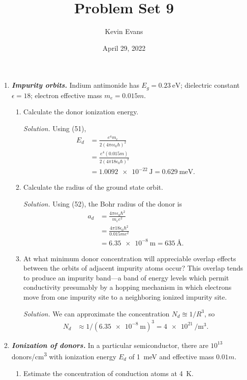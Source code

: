 \documentclass{homework}
\title{Problem Set 9}
\author{Kevin Evans}
\date{April 29, 2022}
\newcommand{\solution}{	\vspace{1em} \textit{Solution.} \quad }
\begin{document}
	\maketitle
	\begin{enumerate}
		\item %
			\textit{\textbf{Impurity orbits.}} Indium antimonide has $E_g = \SI{0.23}{\eV}$; dielectric constant $\epsilon=18$; electron effective mass $m_e = 0.015 m$. \begin{enumerate}
				\item Calculate the donor ionization energy.
				
				\solution Using (51), \begin{align*}
					E_d & = \frac{e^4 m_e}{2(4 \pi \epsilon \epsilon_0 \hbar)^2} \\
						& = \frac{e^4 (0.015 m)}{2 (4 \pi 18 \epsilon_0 \hbar)^2} \\
						& = \SI{1.0092e-22}{\J} = \SI{0.629}{\meV}.
				\end{align*}
				
				\item Calculate the radius of the ground state orbit.
				
				\solution Using (52), the Bohr radius of the donor is \begin{align*}
					a_d & = \frac{4 \pi \epsilon \epsilon_0 \hbar^2}{m_e e^2} \\
						& = \frac{4 \pi 18 \epsilon_0 \hbar^2}{0.015 m e^2} \\
						& = \SI{6.35e-8}{\m} = \SI{635}{\angstrom}.
				\end{align*}
			
				\item At what minimum donor concentration will appreciable overlap effects between the orbits of adjacent impurity atoms occur? This overlap tends to produce an impurity band---a band of energy levels which permit conductivity presumably by a hopping mechanism in which electrons move from one impurity site to a neighboring ionized impurity site.
				
				\solution
				We can approximate the concentration $N_d \approxeq 1/R^3$, so \begin{align*}
					N_d & \approx 1/ (\SI{6.35e-8}{\m})^3 = \SI{4e21}{\per\meter\cubed}.
				\end{align*}
			\end{enumerate}
		
		\pagebreak
		
		\item %
			\textit{\textbf{Ionization of donors.}} In a particular semiconductor, there are $10^{13}$ \si{donors/\centi\meter\cubed} with ionization energy $E_d$ of \SI{1}{\meV} and effective mass $0.01m$. \begin{enumerate}
				\item Estimate the concentration of conduction atoms at \SI{4}{\K}.
				

\end{enumerate}
\end{enumerate}
\end{document}
